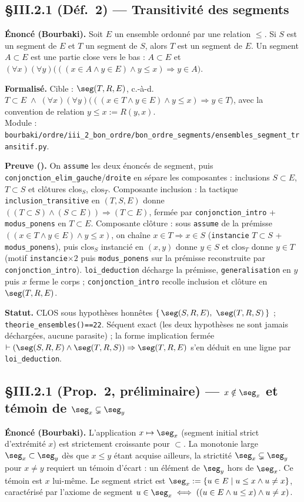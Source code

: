 \subsection{§III.2.1 (Déf.~2) --- Transitivité des segments}
\textbf{Énoncé (Bourbaki).} Soit $E$ un ensemble ordonné par une relation $\le$. Si $S$ est un segment de $E$ et $T$ un segment de $S$, alors $T$ est un segment de $E$. Un segment $A\subset E$ est une partie close vers le bas : $A\subset E$ et $(\forall x)(\forall y)\bigl(((x\in A \wedge y\in E)\wedge y\le x)\Rightarrow y\in A\bigr)$.

\textbf{Formalisé.} Cible : $\seg(T,R,E)$, c.-à-d. $T\subset E \;\wedge\; (\forall x)(\forall y)\bigl(((x\in T\wedge y\in E)\wedge y\le x)\Rightarrow y\in T\bigr)$, avec la convention de relation $y\le x := R(y,x)$. \\
Module : \texttt{bourbaki/ordre/iii\_2\_bon\_ordre/bon\_ordre\_segments/ensembles\_segment\_transitif.py}.

\textbf{Preuve (\Nstar).} On \texttt{assume} les deux énoncés de segment, puis \texttt{conjonction\_elim\_gauche}/\texttt{droite} en sépare les composantes : inclusions $S\subset E$, $T\subset S$ et clôtures $\mathrm{clos}_S$, $\mathrm{clos}_T$. Composante inclusion : la tactique \texttt{inclusion\_transitive} en $(T,S,E)$ donne $((T\subset S)\wedge(S\subset E))\Rightarrow(T\subset E)$, fermée par \texttt{conjonction\_intro} + \texttt{modus\_ponens} en $T\subset E$. Composante clôture : sous \texttt{assume} de la prémisse $((x\in T\wedge y\in E)\wedge y\le x)$, on chaîne $x\in T \Rightarrow x\in S$ (\texttt{instancie} $T\subset S$ + \texttt{modus\_ponens}), puis $\mathrm{clos}_S$ instancié en $(x,y)$ donne $y\in S$ et $\mathrm{clos}_T$ donne $y\in T$ (motif \texttt{instancie}$\times 2$ puis \texttt{modus\_ponens} sur la prémisse reconstruite par \texttt{conjonction\_intro}). \texttt{loi\_deduction} décharge la prémisse, \texttt{generalisation} en $y$ puis $x$ ferme le corps ; \texttt{conjonction\_intro} recolle inclusion et clôture en $\seg(T,R,E)$.

\textbf{Statut.} CLOS sous hypothèses honnêtes $\{\,\seg(S,R,E),\ \seg(T,R,S)\,\}$ ; \texttt{theorie\_ensembles()==22}. Séquent exact (les deux hypothèses ne sont jamais déchargées, aucune parasite) ; la forme implication fermée $\vdash (\seg(S,R,E)\wedge\seg(T,R,S))\Rightarrow\seg(T,R,E)$ s'en déduit en une ligne par \texttt{loi\_deduction}.

\subsection{§III.2.1 (Prop.~2, préliminaire) --- $x\notin \seg_x$ et témoin de $\seg_x \subsetneq \seg_y$}
\textbf{Énoncé (Bourbaki).} L'application $x\mapsto \seg_x$ (segment initial strict d'extrémité $x$) est strictement croissante pour $\subset$. La monotonie large $\seg_x\subset\seg_y$ dès que $x\le y$ étant acquise ailleurs, la strictité $\seg_x\subsetneq\seg_y$ pour $x\neq y$ requiert un témoin d'écart : un élément de $\seg_y$ hors de $\seg_x$. Ce témoin est $x$ lui-même. Le segment strict est $\seg_x := \{u\in E \mid u\le x \wedge u\neq x\}$, caractérisé par l'axiome de segment $u\in\seg_x \iff ((u\in E \wedge u\le x)\wedge u\neq x)$.

